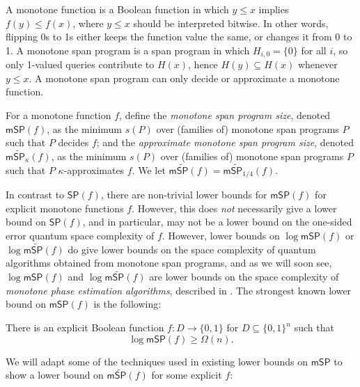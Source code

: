\documentclass{toc}
\begin{document}
A monotone function is a Boolean function in which $y\leq x$ implies $f(y)\leq f(x)$, where $y\leq x$ should be interpreted bitwise. In other words, flipping 0s to 1s either keeps the function value the same, or changes it from 0 to 1. 
A monotone span program is a span program in which $H_{i,0}=\{0\}$ for all $i$, so only 1-valued queries contribute to $H(x)$, hence $H(y)\subseteq H(x)$ whenever $y\leq x$. A monotone span program can only decide or approximate a monotone function. 

\begin{definition}\label{def:monotoneSP}
For a monotone function $f$, define the \emph{monotone span program size}, denoted $\mathsf{mSP}(f)$, as the minimum $s(P)$ over (families of) monotone span programs $P$ such that $P$ decides $f$; and the \emph{approximate monotone span program size}, denoted $\mathsf{m}\widetilde{\mathsf{SP}}_\kappa(f)$, as the minimum $s(P)$ over (families of) monotone span programs $P$ such that $P$ $\kappa$-approximates $f$. We let $\mathsf{m}\widetilde{\mathsf{SP}}(f)=\mathsf{m}\widetilde{\mathsf{SP}}_{1/4}(f)$.
\end{definition}

In contrast to $\mathsf{SP}(f)$, there are non-trivial lower bounds for $\mathsf{mSP}(f)$ for explicit monotone functions $f$. However, this does \emph{not} necessarily give a lower bound on $\mathsf{SP}(f)$, and in particular, may not be a lower bound on the one-sided error quantum space complexity of $f$. However, lower bounds on $\log\mathsf{mSP}(f)$ or $\log\mathsf{m}\widetilde{\mathsf{SP}}(f)$ do give lower bounds on the space complexity of quantum algorithms obtained from monotone span programs, and as we will soon see, $\log\mathsf{mSP}(f)$ and $\log\mathsf{m}\widetilde{\mathsf{SP}}(f)$ are lower bounds on the space complexity of \emph{monotone phase estimation algorithms}, described in .
The strongest known lower bound on $\mathsf{mSP}(f)$ is the following:
\begin{theorem}[\cite{PR17}]\label{thm:PR}
There is an explicit Boolean function $f:D\rightarrow\{0,1\}$ for $D\subseteq\{0,1\}^n$ such that
$$\log\mathsf{mSP}(f)\geq \Omega(n).$$
\end{theorem}

We will adapt some of the techniques used in existing lower bounds on $\mathsf{mSP}$ to show a lower bound on $\mathsf{m}\widetilde{\mathsf{SP}}(f)$ for some explicit $f$:
\end{document}
